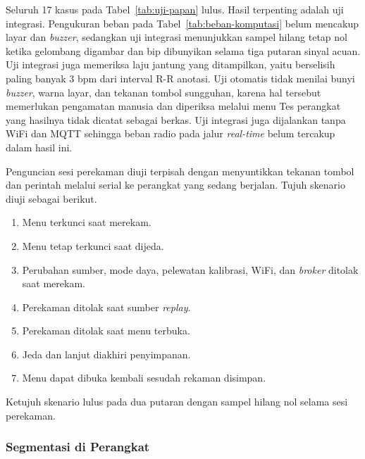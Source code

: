 Seluruh 17 kasus pada Tabel~\ref{tab:uji-papan} lulus. Hasil terpenting adalah uji integrasi. Pengukuran beban pada Tabel~\ref{tab:beban-komputasi} belum mencakup layar dan \textit{buzzer}, sedangkan uji integrasi menunjukkan sampel hilang tetap nol ketika gelombang digambar dan bip dibunyikan selama tiga putaran sinyal acuan. Uji integrasi juga memeriksa laju jantung yang ditampilkan, yaitu berselisih paling banyak 3 bpm dari interval R-R anotasi. Uji otomatis tidak menilai bunyi \textit{buzzer}, warna layar, dan tekanan tombol sungguhan, karena hal tersebut memerlukan pengamatan manusia dan diperiksa melalui menu Tes perangkat yang hasilnya tidak dicatat sebagai berkas. Uji integrasi juga dijalankan tanpa WiFi dan MQTT sehingga beban radio pada jalur \textit{real-time} belum tercakup dalam hasil ini.

Penguncian sesi perekaman diuji terpisah dengan menyuntikkan tekanan tombol dan perintah melalui serial ke perangkat yang sedang berjalan. Tujuh skenario diuji sebagai berikut.
\begin{enumerate}
  \item Menu terkunci saat merekam.
  \item Menu tetap terkunci saat dijeda.
  \item Perubahan sumber, mode daya, pelewatan kalibrasi, WiFi, dan \textit{broker} ditolak saat merekam.
  \item Perekaman ditolak saat sumber \textit{replay}.
  \item Perekaman ditolak saat menu terbuka.
  \item Jeda dan lanjut diakhiri penyimpanan.
  \item Menu dapat dibuka kembali sesudah rekaman disimpan.
\end{enumerate}
Ketujuh skenario lulus pada dua putaran dengan sampel hilang nol selama sesi perekaman.

\subsubsection{Segmentasi di Perangkat}

